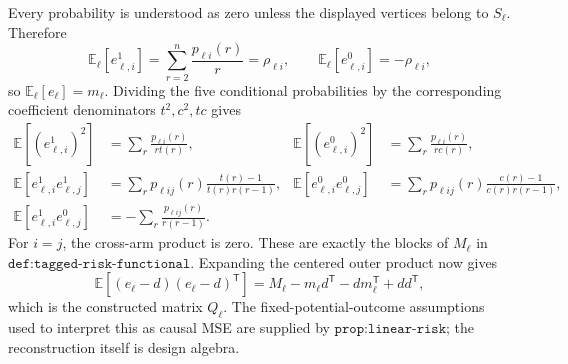 Every probability is understood as zero unless the displayed vertices belong to \(S_\ell\).  Therefore
\[
 \mathbb E_\ell[e_{\ell,i}^{1}]=\sum_{r=2}^n\frac{p_{\ell i}(r)}r=\rho_{\ell i},
 \qquad
 \mathbb E_\ell[e_{\ell,i}^{0}]=-\rho_{\ell i},
\]
so \(\mathbb E_\ell[e_\ell]=m_\ell\).  Dividing the five conditional probabilities by the corresponding coefficient denominators \(t^2,c^2,tc\) gives
\[
 \begin{aligned}
 \mathbb E[(e_{\ell,i}^{1})^2]&=\sum_r\frac{p_{\ell i}(r)}{rt(r)},&
 \mathbb E[(e_{\ell,i}^{0})^2]&=\sum_r\frac{p_{\ell i}(r)}{rc(r)},\\
 \mathbb E[e_{\ell,i}^{1}e_{\ell,j}^{1}]&=\sum_rp_{\ell ij}(r)\frac{t(r)-1}{t(r)r(r-1)},&
 \mathbb E[e_{\ell,i}^{0}e_{\ell,j}^{0}]&=\sum_rp_{\ell ij}(r)\frac{c(r)-1}{c(r)r(r-1)},\\
 \mathbb E[e_{\ell,i}^{1}e_{\ell,j}^{0}]&=-\sum_r\frac{p_{\ell ij}(r)}{r(r-1)}.
 \end{aligned}
\]
For \(i=j\), the cross-arm product is zero.  These are exactly the blocks of \(M_\ell\) in \(\texttt{def:tagged-risk-functional}\).  Expanding the centered outer product now gives
\[
 \mathbb E[(e_\ell-d)(e_\ell-d)^{\mathsf T}]
 =M_\ell-m_\ell d^{\mathsf T}-d m_\ell^{\mathsf T}+dd^{\mathsf T},
\]
which is the constructed matrix \(Q_\ell\).  The fixed-potential-outcome assumptions used to interpret this as causal MSE are supplied by \(\texttt{prop:linear-risk}\); the reconstruction itself is design algebra.

